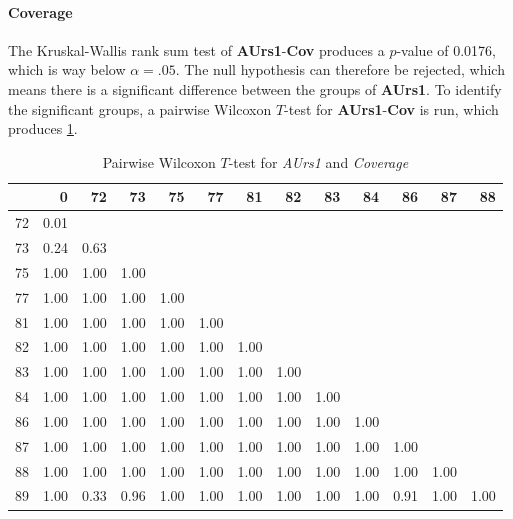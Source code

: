 \paragraph{Coverage}
The Kruskal-Wallis rank sum test of \textbf{AUrs1}-\textbf{Cov} produces a $p$-value of 0.0176, which is way below $\alpha=.05$. The null hypothesis can therefore be rejected, which means there is a significant difference between the groups of \textbf{AUrs1}. To identify the significant groups, a pairwise Wilcoxon $T$-test for \textbf{AUrs1}-\textbf{Cov} is run, which produces \cref{tbl:wilcoxon_baysis_initiator_AUrs1_Cov}. 
\begin{table}[ht]
	\small
	\centering
    \begin{tabular}{rrrrrrrrrrrrr}
        \toprule
        & 0 & 72 & 73 & 75 & 77 & 81 & 82 & 83 & 84 & 86 & 87 & 88 \\ 
        \midrule
        72 & 0.01 &  &  &  &  &  &  &  &  &  &  &  \\ 
        73 & 0.24 & 0.63 &  &  &  &  &  &  &  &  &  &  \\ 
        75 & 1.00 & 1.00 & 1.00 &  &  &  &  &  &  &  &  &  \\ 
        77 & 1.00 & 1.00 & 1.00 & 1.00 &  &  &  &  &  &  &  &  \\ 
        81 & 1.00 & 1.00 & 1.00 & 1.00 & 1.00 &  &  &  &  &  &  &  \\ 
        82 & 1.00 & 1.00 & 1.00 & 1.00 & 1.00 & 1.00 &  &  &  &  &  &  \\ 
        83 & 1.00 & 1.00 & 1.00 & 1.00 & 1.00 & 1.00 & 1.00 &  &  &  &  &  \\ 
        84 & 1.00 & 1.00 & 1.00 & 1.00 & 1.00 & 1.00 & 1.00 & 1.00 &  &  &  &  \\ 
        86 & 1.00 & 1.00 & 1.00 & 1.00 & 1.00 & 1.00 & 1.00 & 1.00 & 1.00 &  &  &  \\ 
        87 & 1.00 & 1.00 & 1.00 & 1.00 & 1.00 & 1.00 & 1.00 & 1.00 & 1.00 & 1.00 &  &  \\ 
        88 & 1.00 & 1.00 & 1.00 & 1.00 & 1.00 & 1.00 & 1.00 & 1.00 & 1.00 & 1.00 & 1.00 &  \\ 
        89 & 1.00 & 0.33 & 0.96 & 1.00 & 1.00 & 1.00 & 1.00 & 1.00 & 1.00 & 0.91 & 1.00 & 1.00 \\ 
        \bottomrule
    \end{tabular}
    \caption{Pairwise Wilcoxon $T$-test for \textit{AUrs1} and \textit{Coverage}}
    \label{tbl:wilcoxon_baysis_initiator_AUrs1_Cov}
\end{table}
